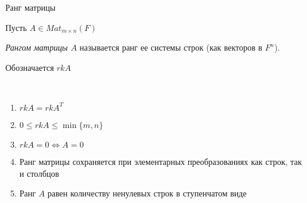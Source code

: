 \bigskip


\begin{definition} Ранг матрицы
    
    Пусть $A \in Mat_{m \times n}(F)$

    \textit{Рангом матрицы $A$} называется ранг ее системы строк (как векторов в $F^n$). 

    Обозначается $rk A$

    \begin{properties}~

        \begin{enumerate}
            \item $rk A = rk A^T$
            \item $0 \leq rk A \leq \min\{m, n\}$
            \item $rk A = 0 \Leftrightarrow A = 0$
            \item Ранг матрицы сохраняется при элементарных преобразованиях как строк, так и столбцов
            \item Ранг $A$ равен количеству ненулевых строк в ступенчатом виде
        \end{enumerate}
        
    \end{properties}

\end{definition}


\bigskip


